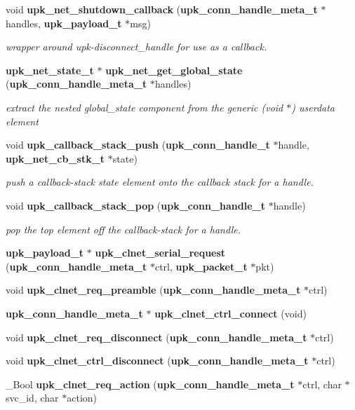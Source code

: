\begin{DoxyCompactItemize}
void {\bf upk\_\-net\_\-shutdown\_\-callback} ({\bf upk\_\-conn\_\-handle\_\-meta\_\-t} $\ast$handles, {\bf upk\_\-payload\_\-t} $\ast$msg)
\begin{DoxyCompactList}\small\item\em wrapper around upk-\/disconnect\_\-handle for use as a callback. \end{DoxyCompactList}\item 
{\bf upk\_\-net\_\-state\_\-t} $\ast$ {\bf upk\_\-net\_\-get\_\-global\_\-state} ({\bf upk\_\-conn\_\-handle\_\-meta\_\-t} $\ast$handles)
\begin{DoxyCompactList}\small\item\em extract the nested global\_\-state component from the generic (void $\ast$) userdata element \end{DoxyCompactList}\item 
void {\bf upk\_\-callback\_\-stack\_\-push} ({\bf upk\_\-conn\_\-handle\_\-t} $\ast$handle, {\bf upk\_\-net\_\-cb\_\-stk\_\-t} $\ast$state)
\begin{DoxyCompactList}\small\item\em push a callback-\/stack state element onto the callback stack for a handle. \end{DoxyCompactList}\item 
void {\bf upk\_\-callback\_\-stack\_\-pop} ({\bf upk\_\-conn\_\-handle\_\-t} $\ast$handle)
\begin{DoxyCompactList}\small\item\em pop the top element off the callback-\/stack for a handle. \end{DoxyCompactList}\item 
{\bf upk\_\-payload\_\-t} $\ast$ {\bf upk\_\-clnet\_\-serial\_\-request} ({\bf upk\_\-conn\_\-handle\_\-meta\_\-t} $\ast$ctrl, {\bf upk\_\-packet\_\-t} $\ast$pkt)
\item 
void {\bf upk\_\-clnet\_\-req\_\-preamble} ({\bf upk\_\-conn\_\-handle\_\-meta\_\-t} $\ast$ctrl)
\item 
{\bf upk\_\-conn\_\-handle\_\-meta\_\-t} $\ast$ {\bf upk\_\-clnet\_\-ctrl\_\-connect} (void)
\item 
void {\bf upk\_\-clnet\_\-req\_\-disconnect} ({\bf upk\_\-conn\_\-handle\_\-meta\_\-t} $\ast$ctrl)
\item 
void {\bf upk\_\-clnet\_\-ctrl\_\-disconnect} ({\bf upk\_\-conn\_\-handle\_\-meta\_\-t} $\ast$ctrl)
\item 
\_\-Bool {\bf upk\_\-clnet\_\-req\_\-action} ({\bf upk\_\-conn\_\-handle\_\-meta\_\-t} $\ast$ctrl, char $\ast$svc\_\-id, char $\ast$action)

\end{DoxyCompactItemize}
